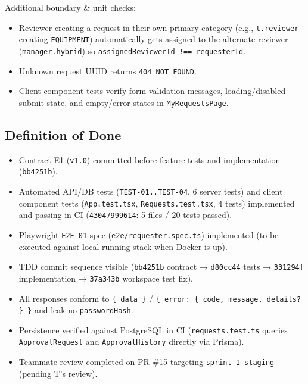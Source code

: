 \documentclass[11pt,a4paper]{article}
\begin{document}
Additional boundary \& unit checks:\\
\begin{itemize}[leftmargin=*,itemsep=2pt,topsep=2pt]
  \item Reviewer creating a request in their own primary category (e.g., \texttt{t.reviewer} creating \texttt{EQUIPMENT}) automatically gets assigned to the alternate reviewer (\texttt{manager.hybrid}) so \texttt{assignedReviewerId !== requesterId}.
  \item Unknown request UUID returns \texttt{404 NOT\_FOUND}.
  \item Client component tests verify form validation messages, loading/disabled submit state, and empty/error states in \texttt{MyRequestsPage}.
\end{itemize}

\subsection{Definition of Done}

\begin{itemize}[leftmargin=*,itemsep=2pt,topsep=2pt]
  \item [x] Contract E1 (\texttt{v1.0}) committed before feature tests and implementation (\texttt{bb4251b}).
  \item [x] Automated API/DB tests (\texttt{TEST-01..TEST-04}, 6 server tests) and client component tests (\texttt{App.test.tsx}, \texttt{Requests.test.tsx}, 4 tests) implemented and passing in CI (\texttt{43047999614}: 5 files / 20 tests passed).
  \item [x] Playwright \texttt{E2E-01} spec (\texttt{e2e/requester.spec.ts}) implemented (to be executed against local running stack when Docker is up).
  \item [x] TDD commit sequence visible (\texttt{bb4251b} contract → \texttt{d80cc44} tests → \texttt{331294f} implementation → \texttt{37a343b} workspace test fix).
  \item [x] All responses conform to \texttt{\{ data \}} / \texttt{\{ error: \{ code, message, details? \} \}} and leak no \texttt{passwordHash}.
  \item [x] Persistence verified against PostgreSQL in CI (\texttt{requests.test.ts} queries \texttt{ApprovalRequest} and \texttt{ApprovalHistory} directly via Prisma).
  \item [ ] Teammate review completed on PR \#15 targeting \texttt{sprint-1-staging} (pending T's review).
\end{itemize}
\end{document}
